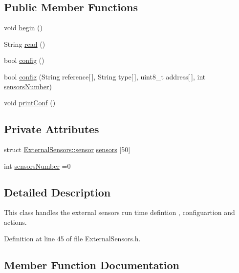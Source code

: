 \subsection*{Public Member Functions}
\begin{DoxyCompactItemize}
\item 
void \hyperlink{class_external_sensors_a58ede0d786a86417254708870f04a21e}{begin} ()
\item 
String \hyperlink{class_external_sensors_a53177b81eca3be89508b5511ddcd00fc}{read} ()
\item 
bool \hyperlink{class_external_sensors_a862a4bd11346b37270d0244c2adabe5a}{config} ()
\item 
bool \hyperlink{class_external_sensors_ac829858f587e15a3fcb00567248f0edd}{config} (String reference\mbox{[}$\,$\mbox{]}, String type\mbox{[}$\,$\mbox{]}, uint8\+\_\+t address\mbox{[}$\,$\mbox{]}, int \hyperlink{class_external_sensors_a58e4fbf9adeae787d92be5fa33043b5d}{sensors\+Number})
\item 
void \hyperlink{class_external_sensors_a78c2bf55084435dd51d3c559b2d3c6f3}{print\+Conf} ()
\end{DoxyCompactItemize}
\subsection*{Private Attributes}
\begin{DoxyCompactItemize}
\item 
struct \hyperlink{struct_external_sensors_1_1sensor}{External\+Sensors\+::sensor} \hyperlink{class_external_sensors_a284233f884fcf00154a44740cf1d9e1e}{sensors} \mbox{[}50\mbox{]}
\item 
int \hyperlink{class_external_sensors_a58e4fbf9adeae787d92be5fa33043b5d}{sensors\+Number} =0
\end{DoxyCompactItemize}


\subsection{Detailed Description}
This class handles the external sensors run time defintion , configuartion and actions. 

Definition at line 45 of file External\+Sensors.\+h.



\subsection{Member Function Documentation}
\mbox{\label{class_external_sensors_a58ede0d786a86417254708870f04a21e}} 
